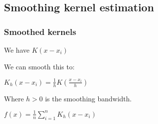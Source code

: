 
\subsection{Smoothing kernel estimation}

\subsubsection{Smoothed kernels}

We have \(K(x-x_i)\)

We can smooth this to:

\(K_h(x-x_i)=\frac{1}{h}K(\frac{x-x_i}{h})\)

Where \(h>0\) is the smoothing bandwidth.

\(f(x)=\frac{1}{n}\sum_{i=1}^nK_h(x-x_i)\)

